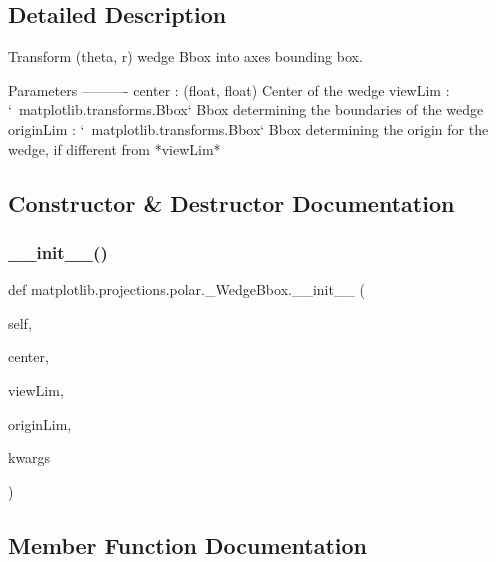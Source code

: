 \subsection{Detailed Description}
\begin{DoxyVerb}Transform (theta, r) wedge Bbox into axes bounding box.

Parameters
----------
center : (float, float)
    Center of the wedge
viewLim : `~matplotlib.transforms.Bbox`
    Bbox determining the boundaries of the wedge
originLim : `~matplotlib.transforms.Bbox`
    Bbox determining the origin for the wedge, if different from *viewLim*
\end{DoxyVerb}
 

\subsection{Constructor \& Destructor Documentation}
\mbox{\label{classmatplotlib_1_1projections_1_1polar_1_1__WedgeBbox_abc49a9b26f2e4a18d87a0ef02888c77d}} 
\subsubsection{\texorpdfstring{\+\_\+\+\_\+init\+\_\+\+\_\+()}{\_\_init\_\_()}}
{\footnotesize\ttfamily def matplotlib.\+projections.\+polar.\+\_\+\+Wedge\+Bbox.\+\_\+\+\_\+init\+\_\+\+\_\+ (\begin{DoxyParamCaption}\item[{}]{self,  }\item[{}]{center,  }\item[{}]{view\+Lim,  }\item[{}]{origin\+Lim,  }\item[{}]{kwargs }\end{DoxyParamCaption})}



\subsection{Member Function Documentation}
\mbox{\label{classmatplotlib_1_1projections_1_1polar_1_1__WedgeBbox_a46a7e81284bbd92e8038079b0266a13f}} 
